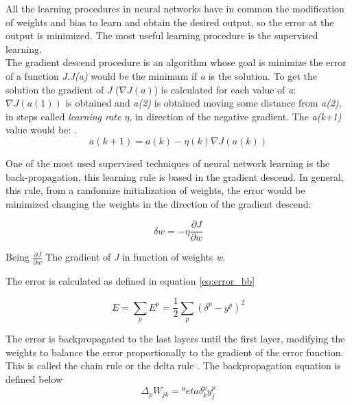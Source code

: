 All the learning procedures in neural networks have in common the modification of weights and bias to learn and obtain the desired output, so the error at the output is minimized. The most useful learning procedure is the supervised learning.\\

The gradient descend procedure is an algorithm whose goal is minimize the error of a function \textit{J}.\textit{J(a)} would be the minimum if \textit{a} is the solution. To get the solution the gradient of \textit{J} ($\nabla J(a)$) is calculated for each value of \textit{a}: $\nabla J(a(1))$ is obtained and \textit{a(2)} is obtained moving some distance from \textit{a(2)}, in steps called \textit{learning rate $\eta$}, in direction of the negative gradient. The \textit{a(k+1)} value would be: \cite{Duda}.\\

\begin{equation}
a(k+1) = a(k) - \eta (k) \nabla J(a(k))
\end{equation}

One of the most used supervised techniques of neural network learning is the back-propagation, this learning rule is based in the gradient descend. In general, this rule, from a randomize initialization of weights, the error would be minimized changing the weights in the direction of the gradient descend:

\begin{equation}
\delta w = -\eta\frac{\partial J}{\partial w}
\end{equation}

Being $\frac{\partial J}{\partial w}$ The gradient of \textit{J} in function of weights \textit{w}.

The error is calculated as defined in equation \ref{eq:error_bb}

\begin{equation}
E=\sum_{p}E^p = \frac{1}{2}\sum_{p}(\delta^p- y^p)^2
\end{equation} \label{eq:error_bb}

The error is backpropagated to the last layers until the first layer, modifying the weights to balance the error proportionally to the gradient of the error function. This is called the chain rule or the delta rule \cite{Duda, BINN, krose}. The backpropagation equation is defined below\\

			\begin{equation}
			\Delta_{p}W_{jk}=ºeta \delta _{k}^{p}y_{j}^{p}
			\label{eq:ecuation_back1}
			\end{equation}\\

